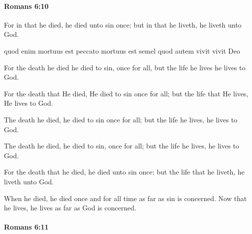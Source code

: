 		\paragraph{Romans 6:10} %
			\label{ROMANS-6-10}

			For in that he died, he died unto sin once: but in that he liveth, he liveth unto God.

			\begin{framed}
			\scriptsize
				\begin{compactdesc}
					\item[SBLG] 
					\item[BSV] quod enim mortuus est peccato mortuus est semel quod autem vivit vivit Deo
					\item[ESV] For the death he died he died to sin, once for all, but the life he lives he lives to God.
					\item[NASB] For the death that He died, He died to sin once for all; but the life that He lives, He lives to God.
					\item[NIV] The death he died, he died to sin once for all; but the life he lives, he lives to God.
					\item[NRSV] The death he died, he died to sin, once for all; but the life he lives, he lives to God.
					\item[ASV] For the death that he died, he died unto sin once: but the life that he liveth, he liveth unto God.
					\item[NIRV] When he died, he died once and for all time as far as sin is concerned. Now that he lives, he lives as far as God is concerned.
				\end{compactdesc}
			\end{framed}

		\paragraph{Romans 6:11} %
			\label{ROMANS-6-11}

